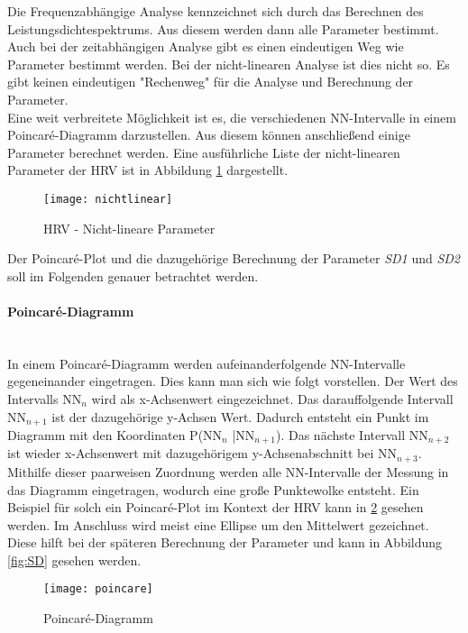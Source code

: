  Die Frequenzabhängige Analyse kennzeichnet sich durch das Berechnen des Leistungsdichtespektrums. Aus diesem werden dann alle Parameter bestimmt. Auch bei der zeitabhängigen Analyse gibt es einen eindeutigen Weg wie Parameter bestimmt werden. Bei der nicht-linearen Analyse ist dies nicht so. Es gibt keinen eindeutigen "Rechenweg" für die Analyse und Berechnung der Parameter. \\ 
 Eine  weit verbreitete Möglichkeit ist es, die verschiedenen NN-Intervalle in einem Poincaré-Diagramm darzustellen. Aus diesem können anschließend einige Parameter berechnet werden. Eine ausführliche Liste der nicht-linearen Parameter der HRV ist in Abbildung  \ref{fig:nichtlinear} dargestellt.\cite{poincare}
  \begin{figure}[H]
 	\centering
 	\texttt{[image: nichtlinear]}
 	\caption{HRV - Nicht-lineare Parameter}
 	\label{fig:nichtlinear}
 	\cite[S.3]{med}
 \end{figure}
 
 Der Poincaré-Plot und die dazugehörige Berechnung der Parameter \textit{SD1} und \textit{SD2} soll im Folgenden genauer betrachtet werden.
 
 \paragraph{Poincaré-Diagramm}\mbox{} \\
 In einem Poincaré-Diagramm werden aufeinanderfolgende NN-Intervalle gegeneinander eingetragen. Dies kann man sich wie folgt vorstellen.
 Der Wert des Intervalls NN$_{n}$  wird als x-Achsenwert eingezeichnet. Das darauffolgende Intervall NN$_{n+1}$ ist der dazugehörige y-Achsen Wert. Dadurch entsteht ein Punkt im Diagramm mit den Koordinaten P(NN$_{n}$ |NN$_{n+1}$). Das nächste Intervall NN$_{n+2}$ ist wieder x-Achsenwert mit dazugehörigem y-Achsenabschnitt bei NN$_{n+3}$. Mithilfe dieser paarweisen Zuordnung werden alle NN-Intervalle der Messung in das Diagramm eingetragen, wodurch eine große Punktewolke entsteht. Ein Beispiel für solch ein  Poincaré-Plot im Kontext der HRV kann in \ref{fig:poincare} gesehen werden. Im Anschluss wird meist eine Ellipse um den Mittelwert gezeichnet. Diese hilft bei der späteren Berechnung der Parameter und kann in Abbildung \ref{fig:SD} gesehen werden.\cite{poincare}

 \begin{figure}[H]
 	\centering
 	\texttt{[image: poincare]}
 	\caption{Poincaré-Diagramm}
 	\label{fig:poincare}
 	\cite{poincare}
 \end{figure}

